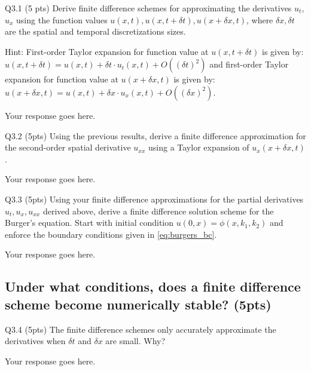 \documentclass[12pt,letterpaper, onecolumn]{exam}
\theoremstyle{definition}
\begin{document}
\color{orange} Q3.1 (5 pts) \color{black} Derive finite difference schemes for approximating the derivatives $u_t$, $u_x$ using the function values $u(x, t), u(x, t+\delta t), u(x+\delta x, t)$, where $\delta x, \delta t$ are the spatial and temporal discretizations sizes.

Hint: First-order Taylor expansion for function value at $u(x, t+\delta t)$ is given by: $u(x, t+\delta t) = u(x, t) + \delta t \cdot u_t(x, t) + O((\delta t)^2)$ and first-order Taylor expansion for function value at $u(x+\delta x, t)$ is given by: $u(x+\delta x, t) = u(x, t) + \delta x \cdot u_x(x, t) + O((\delta x)^2)$. 

\begin{tcolorbox}\centering
    Your response goes here. 
\end{tcolorbox}

\color{black}
\color{orange} Q3.2 (5pts) \color{black} Using the previous results, derive a finite difference approximation for the second-order spatial derivative $u_{xx}$ using a Taylor expansion of $u_x(x+\delta x, t)$. 
\begin{tcolorbox}\centering
    Your response goes here. 
\end{tcolorbox}
\color{black}

\color{orange} Q3.3 (5pts) \color{black} Using your finite difference approximations for the partial derivatives $u_t, u_x, u_{xx}$ derived above, derive a finite difference solution scheme for the Burger's equation. Start with initial condition $u(0, x) = \phi(x, k_1, k_2)$ and enforce the boundary conditions given in \eqref{eq:burgers_bc}.
\begin{tcolorbox}\centering
    Your response goes here. 
\end{tcolorbox}
\color{black}

\subsection{Under what conditions, does a finite difference scheme become numerically stable? (5pts)}

\color{orange} Q3.4 (5pts) \color{black} The finite difference schemes only accurately approximate the derivatives when $\delta t$ and $\delta x$ are small. Why?
\begin{tcolorbox}\centering
    Your response goes here. 
\end{tcolorbox}
\color{black} 
\end{document}
